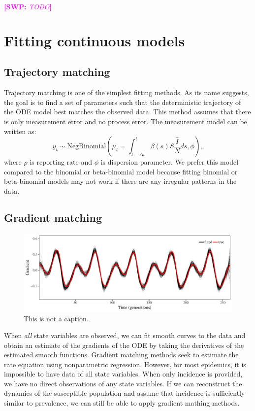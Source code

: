 \documentclass{article}
\newcommand{\comment}[3]{\textcolor{#1}{\textbf{[#2: }\textsl{#3}\textbf{]}}}
\newcommand{\swp}[1]{\comment{magenta}{SWP}{#1}}
\begin{document}
\swp{TODO}


\section{Fitting continuous models}

\subsection{Trajectory matching}

Trajectory matching is one of the simplest fitting methods.
As its name suggests, the goal is to find a set of parameters such that the deterministic trajectory of the ODE model best matches the observed data.
This method assumes that there is only measurement error and no process error.
The measurement model can be written as:
\begin{equation}
y_t \sim \mathrm{NegBinomial}\left(\mu_t= \int_{t-\Delta t}^{t} \beta(s) S \frac{\hat{I}}{N} ds, \phi \right),
\end{equation}
where $\rho$ is reporting rate and $\phi$ is dispersion parameter.
We prefer this model compared to the binomial or beta-binomial model because fitting binomial or beta-binomial models may not work if there are any irregular patterns in the data.

\subsection{Gradient matching}

\begin{figure}[t]
\includegraphics[width=\textwidth]{../figure/gradient_matching_sinusoidal.pdf}
\caption{This is not a caption.}
\end{figure}

When \emph{all} state variables are observed, we can fit smooth curves to the data and obtain an estimate of the gradients of the ODE by taking the derivatives of the estimated smooth functions.
Gradient matching methods seek to estimate the rate equation using nonparametric regression.
However, for most epidemics, it is impossible to have data of all state variables.
When only incidence is provided, we have no direct observations of any state variables. 
If we can reconstruct the dynamics of the susceptible population and assume that incidence is sufficiently similar to prevalence, we can still be able to apply gradient mathing methods.
\end{document}
